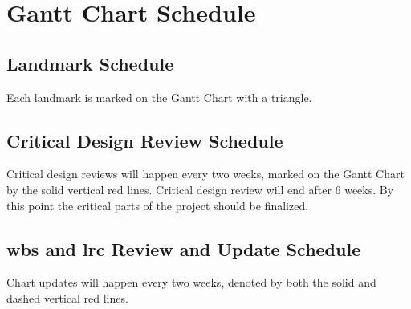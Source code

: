 \section{Gantt Chart Schedule}
\subsection{Landmark Schedule}
Each landmark is marked on the Gantt Chart with a triangle.
\subsection{Critical Design Review Schedule}
Critical design reviews will happen every two weeks, marked on the Gantt Chart by the solid vertical red lines.
Critical design review will end after 6 weeks. By this point the critical parts of the project should be finalized. 
\subsection{\gls{wbs} and \gls{lrc} Review and Update Schedule}
Chart updates will happen every two weeks, denoted by both the solid and dashed vertical red lines.
